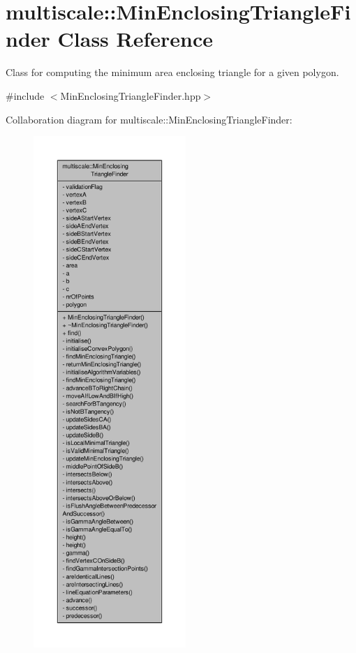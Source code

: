 \hypertarget{classmultiscale_1_1MinEnclosingTriangleFinder}{\section{multiscale\-:\-:Min\-Enclosing\-Triangle\-Finder Class Reference}
\label{classmultiscale_1_1MinEnclosingTriangleFinder}
}


Class for computing the minimum area enclosing triangle for a given polygon.  




{\ttfamily \#include $<$Min\-Enclosing\-Triangle\-Finder.\-hpp$>$}



Collaboration diagram for multiscale\-:\-:Min\-Enclosing\-Triangle\-Finder\-:\nopagebreak
\begin{figure}[H]
\begin{center}
\leavevmode
\includegraphics[height=550pt]{classmultiscale_1_1MinEnclosingTriangleFinder__coll__graph}
\end{center}
\end{figure}
